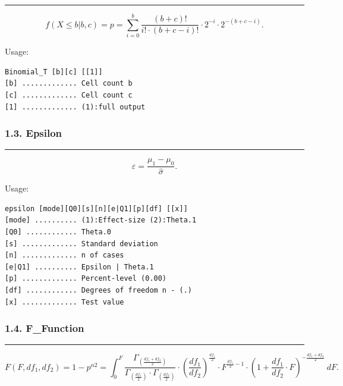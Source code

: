 \documentclass[
]{article}
\begin{document}
\begin{center}\rule{0.5\linewidth}{0.5pt}\end{center}

\[f\left( X \leq b|b,c \right) = p = \sum_{i = 0}^{b}\frac{(b + c)!}{i! \cdot (b + c - i)!} \cdot 2^{- i} \cdot 2^{- (b + c - i)}.\]

Usage:

\begin{verbatim}
Binomial_T [b][c] [[1]]
[b] ............. Cell count b
[c] ............. Cell count c
[1] ............. (1):full output
\end{verbatim}

\hypertarget{epsilon}{%
\subsubsection{1.3. Epsilon}\label{epsilon}}

\begin{center}\rule{0.5\linewidth}{0.5pt}\end{center}

\[\varepsilon = \frac{\mu_{1} - \mu_{0}}{\widehat{\sigma}}.\]

Usage:

\begin{verbatim}
epsilon [mode][Q0][s][n][e|Q1][p][df] [[x]]
[mode] .......... (1):Effect-size (2):Theta.1
[Q0] ............ Theta.0
[s] ............. Standard deviation
[n] ............. n of cases
[e|Q1] .......... Epsilon | Theta.1
[p] ............. Percent-level (0.00)
[df] ............ Degrees of freedom n - (.)
[x] ............. Test value
\end{verbatim}

\hypertarget{f_function}{%
\subsubsection{1.4. F\_Function}\label{f_function}}

\begin{center}\rule{0.5\linewidth}{0.5pt}\end{center}

\[F\left( F,df_{1},df_{2} \right) = 1 - p^{\alpha 2} = \int_{0}^{F}\frac{\Gamma_{\left( \frac{df_{1} + df_{2}}{2} \right)}}{\Gamma_{\left( \frac{df_{1}}{2} \right)} \cdot \Gamma_{\left( \frac{df_{2}}{2} \right)}} \cdot \left( \frac{df_{1}}{df_{2}} \right)^{\frac{df_{1}}{2}} \cdot F^{\frac{df_{1}}{2} - 1} \cdot \left( 1 + \frac{df_{1}}{df_{2}} \cdot F \right)^{- \frac{df_{1} + df_{2}}{2}}\ dF.\]
\end{document}
